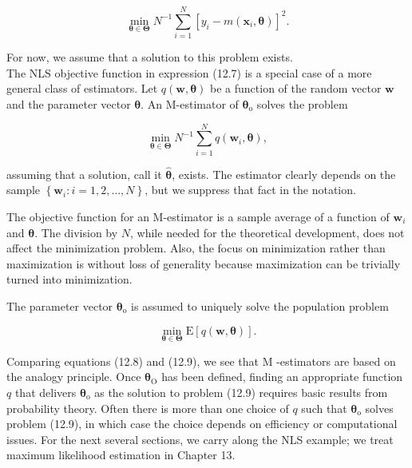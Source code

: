 \documentclass[10pt]{article}
\begin{document}
\begin{equation*}
\min _{\boldsymbol{\theta} \in \boldsymbol{\Theta}} N^{-1} \sum_{i=1}^{N}\left[y_{i}-m\left(\mathbf{x}_{i}, \boldsymbol{\theta}\right)\right]^{2} . \tag{12.7}
\end{equation*}


For now, we assume that a solution to this problem exists.\\
The NLS objective function in expression (12.7) is a special case of a more general class of estimators. Let $q(\mathbf{w}, \boldsymbol{\theta})$ be a function of the random vector $\mathbf{w}$ and the parameter vector $\boldsymbol{\theta}$. An M-estimator of $\boldsymbol{\theta}_{\mathrm{o}}$ solves the problem


\begin{equation*}
\min _{\boldsymbol{\theta} \in \boldsymbol{\Theta}} N^{-1} \sum_{i=1}^{N} q\left(\mathbf{w}_{i}, \boldsymbol{\theta}\right), \tag{12.8}
\end{equation*}


assuming that a solution, call it $\hat{\boldsymbol{\theta}}$, exists. The estimator clearly depends on the sample $\left\{\mathbf{w}_{i}: i=1,2, \ldots, N\right\}$, but we suppress that fact in the notation.

The objective function for an M-estimator is a sample average of a function of $\mathbf{w}_{i}$ and $\boldsymbol{\theta}$. The division by $N$, while needed for the theoretical development, does not affect the minimization problem. Also, the focus on minimization rather than maximization is without loss of generality because maximization can be trivially turned into minimization.

The parameter vector $\boldsymbol{\theta}_{\mathrm{o}}$ is assumed to uniquely solve the population problem


\begin{equation*}
\min _{\boldsymbol{\theta} \in \boldsymbol{\Theta}} \mathrm{E}[q(\mathbf{w}, \boldsymbol{\theta})] . \tag{12.9}
\end{equation*}


Comparing equations (12.8) and (12.9), we see that M -estimators are based on the analogy principle. Once $\boldsymbol{\theta}_{\mathrm{O}}$ has been defined, finding an appropriate function $q$ that delivers $\boldsymbol{\theta}_{\mathrm{o}}$ as the solution to problem (12.9) requires basic results from probability theory. Often there is more than one choice of $q$ such that $\boldsymbol{\theta}_{\mathrm{o}}$ solves problem (12.9), in which case the choice depends on efficiency or computational issues. For the next several sections, we carry along the NLS example; we treat maximum likelihood estimation in Chapter 13.
\end{document}
